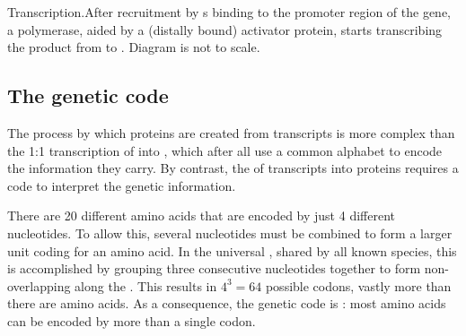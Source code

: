     {Transcription.}{After recruitment by s binding to the promoter
    region of the gene, a polymerase, aided by a (distally bound) activator
    protein, starts transcribing the  product from \fivep to \threep.
    Diagram is not to scale.}

\subsection{The genetic code}

The process by which proteins are created from \mrna transcripts is more complex
than the 1:1 transcription of \dna into \rna, which after all use a common
alphabet to encode the information they carry. By contrast, the
 of \mrna transcripts into proteins requires a code to
interpret the genetic information.

There are \num{20} different amino acids that are encoded by just \num{4}
different nucleotides. To allow this, several nucleotides must be combined to
form a larger unit coding for an amino acid. In the universal , shared by all known species, this is accomplished by grouping three
consecutive nucleotides together to form non-overlapping  along
the \mrna. This results in \(4^3 = 64\) possible codons, vastly more than there
are amino acids. As a consequence, the genetic code is : most
amino acids can be encoded by more than a single codon.

